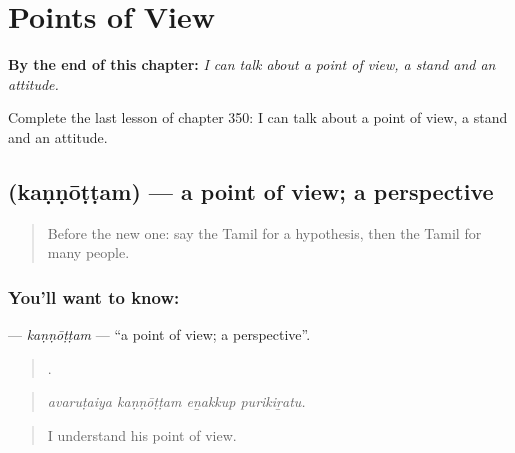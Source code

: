 
\chapter{Points of View}
\label{ch:ta-points-of-view}

\begin{chapteropening}
\textbf{By the end of this chapter:} \emph{I can talk about a point of view, a stand and an attitude.}

Complete the last lesson of chapter 350: I can talk about a point of view, a stand and an attitude.
\end{chapteropening}

\section[\texorpdfstring{\ta{கண்ணோட்டம்} (kaṇṇōṭṭam)}{கண்ணோட்டம் (kaṇṇōṭṭam)}]{ (kaṇṇōṭṭam) — a point of view; a perspective}

\label{lesson:TA-C350-kannottam}



\begin{quote}
Before the new one: say the Tamil for a hypothesis, then the Tamil for many people.
\end{quote}

\subsection*{You'll want to know: }
\textbf{} — \emph{kaṇṇōṭṭam} — \textquotedblleft{}a point of view; a perspective\textquotedblright{}.

\begin{quote}
   .
\end{quote}

\begin{quote}
\emph{avaruṭaiya kaṇṇōṭṭam eṉakkup purikiṟatu.}
\end{quote}

\begin{quote}
I understand his point of view.
\end{quote}

